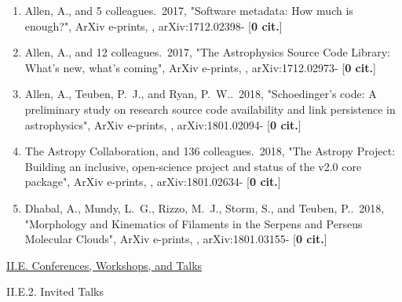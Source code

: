\documentclass[11pt,letterpaper]{article}
\begin{document}
\begin{enumerate}[resume,label=\textbf{\arabic*}.]
\item  
Allen, A., and 5 colleagues.\  2017,  "Software metadata: How much is 
enough?", ArXiv e-prints,  , arXiv:1712.02398- [{\bf 0 cit.}] 

\item  
Allen, A., and 12 colleagues.\  2017,  "The Astrophysics Source Code 
Library: What's new, what's coming", ArXiv e-prints,  , arXiv:1712.02973- 
[{\bf 0 cit.}] 





\item  
Allen, A., Teuben, P.~J., and Ryan, P.~W..\  2018,  "Schoedinger's code: A 
preliminary study on research source code availability and link persistence 
in astrophysics", ArXiv e-prints,  , arXiv:1801.02094- [{\bf 0 cit.}] 

\item  
The Astropy Collaboration, and 136 colleagues.\  2018,  "The Astropy 
Project: Building an inclusive, open-science project and status of the v2.0 
core package", ArXiv e-prints,  , arXiv:1801.02634- [{\bf 0 cit.}] 

\item  
Dhabal, A., Mundy, L.~G., Rizzo, M.~J., Storm, S., and Teuben, P..\  2018,  
"Morphology and Kinematics of Filaments in the Serpens and Perseus 
Molecular Clouds", ArXiv e-prints,  , arXiv:1801.03155- [{\bf 0 cit.}] 


  

\end{enumerate}









\underline{II.E. Conferences, Workshops, and Talks}


II.E.2. Invited Talks
\end{document}
